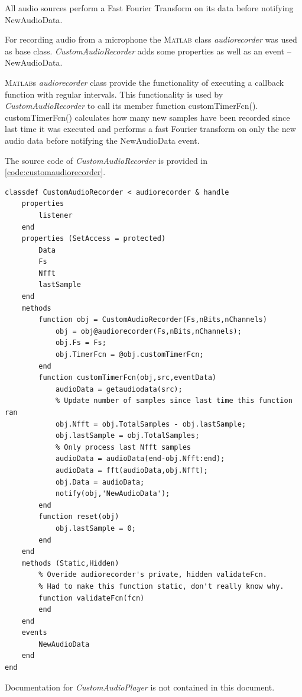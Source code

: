 \documentclass[journal]{IEEEtran}
\begin{document}
All audio sources perform a Fast Fourier Transform on its data before notifying NewAudioData.

For recording audio from a microphone the \textsc{Matlab} class \emph{audiorecorder} was used as base class. \emph{CustomAudioRecorder} adds some properties as well as an event -- NewAudioData.

\textsc{Matlab}s \emph{audiorecorder} class provide the functionality of executing a callback function with regular intervals. This functionality is used by \emph{CustomAudioRecorder} to call its member function customTimerFcn(). 
customTimerFcn() calculates how many new samples have been recorded since last time it was executed and performs a fast Fourier transform on only the new audio data before notifying the NewAudioData event.

The source code of \emph{CustomAudioRecorder} is provided in \autoref*{code:customaudiorecorder}.

\begin{lstlisting}[caption={CustomAudioRecorder.m: Source code of CustomAudioRecorder},
                   label={code:customaudiorecorder}]
classdef CustomAudioRecorder < audiorecorder & handle
    properties
        listener
    end
    properties (SetAccess = protected)
        Data
        Fs
        Nfft
        lastSample
    end
    methods
        function obj = CustomAudioRecorder(Fs,nBits,nChannels)
            obj = obj@audiorecorder(Fs,nBits,nChannels);
            obj.Fs = Fs;
            obj.TimerFcn = @obj.customTimerFcn;
        end
        function customTimerFcn(obj,src,eventData)
            audioData = getaudiodata(src);
            % Update number of samples since last time this function ran
            obj.Nfft = obj.TotalSamples - obj.lastSample;
            obj.lastSample = obj.TotalSamples;
            % Only process last Nfft samples
            audioData = audioData(end-obj.Nfft:end);
            audioData = fft(audioData,obj.Nfft);
            obj.Data = audioData;
            notify(obj,'NewAudioData');
        end
        function reset(obj)
            obj.lastSample = 0;
        end
    end
    methods (Static,Hidden)
        % Overide audiorecorder's private, hidden validateFcn.
        % Had to make this function static, don't really know why.
        function validateFcn(fcn)
        end
    end
    events
        NewAudioData
    end
end
\end{lstlisting}

Documentation for \emph{CustomAudioPlayer} is not contained in this document.
\end{document}
